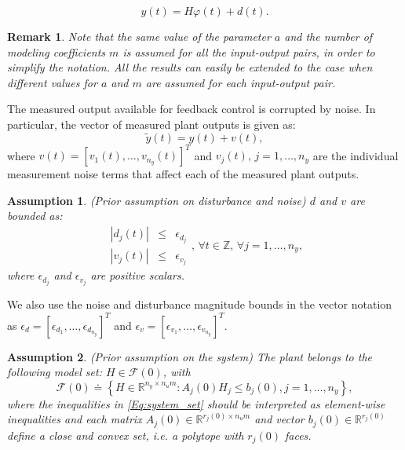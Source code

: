 \documentclass[10 pt, letterpaper]{article}
\newcommand{\beq}{\begin{equation}}
\newcommand{\eeq}{\end{equation}}
\newcommand{\ba}{\begin{array}}
\newcommand{\ea}{\end{array}}
\newcommand{\bR}{{\mathbb R}}
\newcommand{\bZ}{{\mathbb Z}}
\newtheorem{assumption}{Assumption}
\newtheorem{remark}{Remark}[section]
\newcommand{\calK}{{\cal K}}
\begin{document}
\beq\label{Eq:plant_output_matrix}
y(t)=H\varphi(t)+d(t).
\eeq
\begin{remark}\label{R:different}
Note that the same value of the parameter $a$ and the number of modeling coefficients $m$ is assumed for all the input-output pairs, in order to simplify the notation. All the results can easily be extended to the case when different values for $a$ and $m$ are assumed for each input-output pair.  
\end{remark}
The measured output available for feedback control is corrupted by noise. In particular, the vector of measured plant outputs is given as:
\beq\label{Eq:measured_output}
\tilde{y}(t)=y(t)+v(t),
\eeq
where $v(t)=[v_1(t),\hdots,v_{n_y}(t)]^T$ and $v_j(t),\, j=1,\hdots,n_y$ are the individual measurement noise terms that affect each of the measured plant outputs.
\begin{assumption}\label{A:disturbance}(Prior assumption on disturbance and noise)
$d$ and $v$ are bounded as:
\beq\label{Eq:dist_bound}
\ba{lll}
|d_j(t)|&\leq&\epsilon_{d_j}\\
|v_j(t)|&\leq&\epsilon_{v_j}
\ea,\,\forall t\in\bZ,\,\forall j=1,\hdots,n_y,
\eeq
where $\epsilon_{d_j}$ and $\epsilon_{v_j}$ are positive scalars.\
\end{assumption}
We also use the noise and disturbance magnitude bounds in the vector notation as $\epsilon_d=[\epsilon_{d_1}, \hdots, \epsilon_{d_{n_y}}]^T$ and $\epsilon_v=[\epsilon_{v_1}, \hdots, \epsilon_{v_{n_y}}]^T$.
\begin{assumption}\label{A:system_class}(Prior assumption on the system)
The plant belongs to the following model set: $H\in \mathcal{F}(0)$, with
\beq\label{Eq:system_set}
\mathcal{F}(0) \doteq \left\{H\in \bR^{n_y\times n_um}: A_{j}(0)H_j\leq b_{j}(0), j=1,\hdots, n_y \right\},
\eeq
where the inequalities in \eqref{Eq:system_set} should be interpreted as element-wise inequalities and each matrix $A_{j}(0)\in \bR^{r_{j}(0)\times n_um}$ and vector $b_{j}(0) \in \bR^{r_{j}(0)}$ define a close and convex set, i.e. a polytope with $r_{j}(0)$ faces.
\end{assumption}
\end{document}
